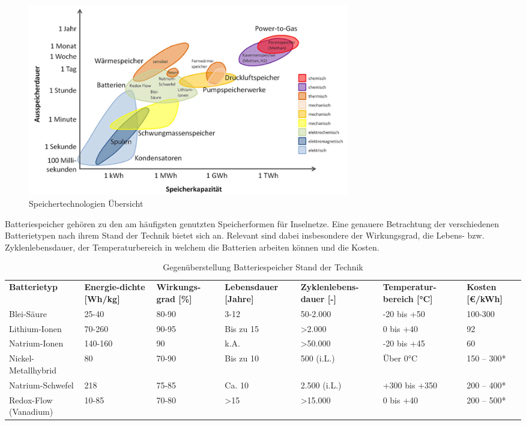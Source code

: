 \begin{figure}[h!]
    \centering
    \includegraphics[width=14cm]{Abbildungen/StandDerTechnikAbb3.png}
    \caption{Speichertechnologien Übersicht\cite{eespeicher}}\label{fig:Speichertechnologien_Übersicht}
\end{figure}
 
Batteriespeicher gehören zu den am häufigsten genutzten Speicherformen für Inselnetze. 
Eine genauere Betrachtung der verschiedenen Batterietypen nach ihrem Stand der Technik bietet sich an. 
Relevant sind dabei insbesondere der Wirkungsgrad, die Lebens- bzw. Zyklenlebensdauer, 
der Temperaturbereich in welchem die Batterien arbeiten können und die Kosten.


\begin{table}    
    \centering
    \caption{Gegenüberstellung Batteriespeicher Stand der Technik}
    \label{tab:Gegenüberstellung_Batteriespeicher_Stand_der_Technik}
    \begin{tabular}{p{2.2cm}|p{2.2cm}|p{2.2cm}|p{2.2cm}|p{2.2cm}|p{2.2cm}|p{2.2cm}|}
        \textbf{Batterietyp} & \textbf{Energie-dichte [Wh/kg]} & \textbf{Wirkungs-grad [\%]} & \textbf{Lebensdauer [Jahre]} & \textbf{Zyklenlebens-dauer [-]} & \textbf{Temperatur-bereich [°C]} & \textbf{Kosten [€/kWh]} \\
        Blei-Säure & 25-40 & 80-90 & 3-12 & 50-2.000 & -20 bis +50 & 100-300 \\
        Lithium-Ionen & 70-260 & 90-95 & Bis zu 15 & >2.000 & 0 bis +40 & 92 \\
        Natrium-Ionen & 140-160 & 90 & k.A. & >50.000 & -20 bis +45 & 60\cite{energieexperten} \\
        Nickel-Metallhybrid & 80 & 70-90 & Bis zu 10 & 500 (i.L.) & Über 0°C & 150 – 300* \\
        Natrium-Schwefel & 218 & 75-85 & Ca. 10 & 2.500 (i.L.) & +300 bis +350 & 200 – 400* \\
        Redox-Flow (Vanadium) & 10-85 & 70-80 & >15 & >15.000 & 0 bis +40 & 200 – 500* \\
    \end{tabular}
\end{table}

